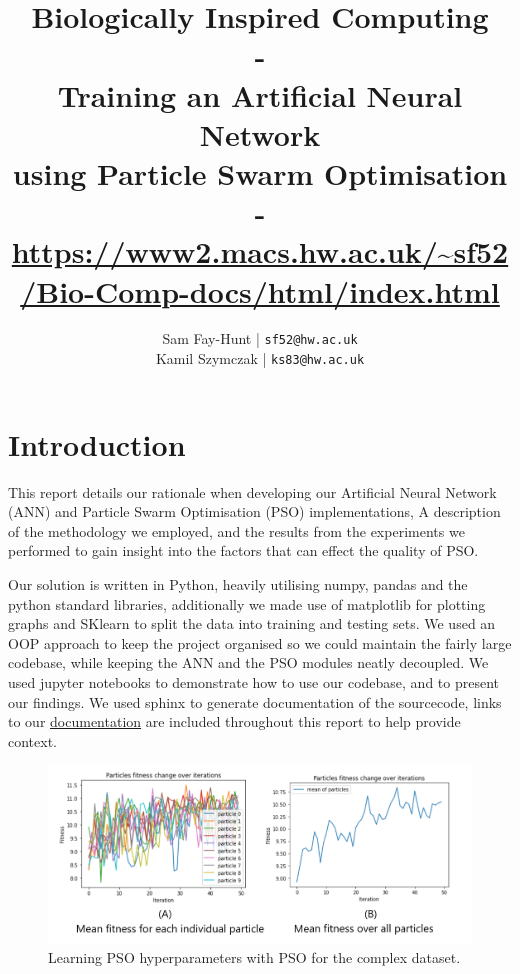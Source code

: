 \documentclass[12pt]{article}
\begin{document}
\title{%
	\bf Biologically Inspired Computing\\ 
    \large - \\
    Training an Artificial Neural Network\\
     using Particle Swarm Optimisation\\
     -\\
     \url{https://www2.macs.hw.ac.uk/~sf52/Bio-Comp-docs/html/index.html}}

\author{
	Sam Fay-Hunt | \texttt{sf52@hw.ac.uk}\\
	Kamil Szymczak | \texttt{ks83@hw.ac.uk}
}

\maketitle
\thispagestyle{empty}
\pagebreak

\tableofcontents
\thispagestyle{empty}
\pagebreak


\setcounter{page}{1}

\section{Introduction}
This report details our rationale when developing our Artificial Neural Network (ANN) and Particle Swarm Optimisation (PSO) implementations, A description of the methodology we employed, and the results from the experiments we performed to gain insight into the factors that can effect the quality of PSO.

Our solution is written in Python, heavily utilising numpy, pandas and the python standard libraries, additionally we made use of matplotlib for plotting graphs and SKlearn to split the data into training and testing sets.
We used an OOP approach to keep the project organised so we could maintain the fairly large codebase, while keeping the ANN and the PSO modules neatly decoupled.
We used jupyter notebooks to demonstrate how to use our codebase, and to present our findings.
We used sphinx to generate documentation of the sourcecode, links to our \href{https://www2.macs.hw.ac.uk/~sf52/Bio-Comp-docs/html/index.html}{documentation} are included throughout this report to help provide context.

\begin{figure}[H]
    \begin{center}
        \includegraphics[width=1\textwidth]{comples_pso_combined.png} 
    \end{center}
    
    \caption{Learning PSO hyperparameters with PSO for the complex dataset.}
    \label{fig:complexpsolearning}   
\end{figure}
\end{document}

